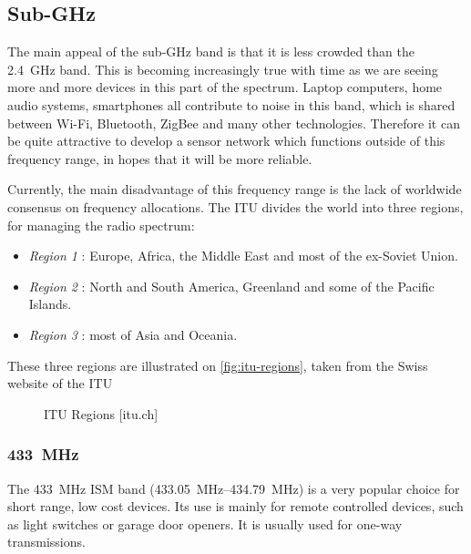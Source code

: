 \subsection{Sub-GHz}

The main appeal of the sub-GHz band is that it is less crowded than the
\SI{2.4}{GHz} band. This is becoming increasingly true with time as we are
seeing more and more devices in this part of the spectrum. Laptop computers,
home audio systems, smartphones all contribute to noise in this band, which is
shared between Wi-Fi, Bluetooth, ZigBee and many other technologies. Therefore
it can be quite attractive to develop a sensor network which functions outside
of this frequency range, in hopes that it will be more reliable.

Currently, the main disadvantage of this frequency range is the lack of
worldwide consensus on frequency allocations. The \ac{ITU} divides the world
into three regions, for managing the radio spectrum:

\begin{itemize}
  \item \emph{Region 1} : Europe, Africa, the Middle East and most of the
    ex-Soviet Union.
  \item \emph{Region 2} : North and South America, Greenland and some of the
    Pacific Islands.
  \item \emph{Region 3} : most of Asia and Oceania.
\end{itemize}

These three regions are illustrated on \autoref{fig:itu-regions}, taken from the
Swiss website of the \ac{ITU}

\begin{figure}[htb]
  \begin{center}
  \end{center}
  \caption{ITU Regions [itu.ch]}
  \label{fig:itu-regions}
\end{figure}

\subsubsection{\SI{433}{MHz}}

The \SI{433}{MHz} ISM band (\SIrange{433.05}{434.79}{MHz})
 is a very popular choice for short range,
low cost devices. Its use is mainly for remote controlled devices, such as light
switches or garage door openers. It is usually used for one-way transmissions.

